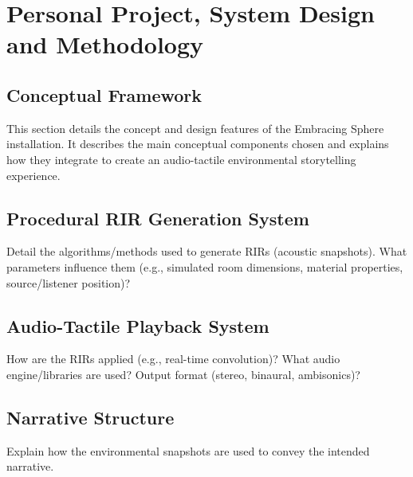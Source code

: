 \chapter{Personal Project, System Design and Methodology}
    \section{Conceptual Framework}
        This section details the concept and design features of the Embracing Sphere installation. It describes the main conceptual components chosen and explains how they integrate to create an audio-tactile environmental storytelling experience.\par

        
    \section{Procedural RIR Generation System} Detail the algorithms/methods used to generate RIRs (acoustic snapshots). What parameters influence them (e.g., simulated room dimensions, material properties, source/listener position)?
    \section{Audio-Tactile Playback System} How are the RIRs applied (e.g., real-time convolution)? What audio engine/libraries are used? Output format (stereo, binaural, ambisonics)?
    \section{Narrative Structure} Explain how the environmental snapshots are used to convey the intended narrative.